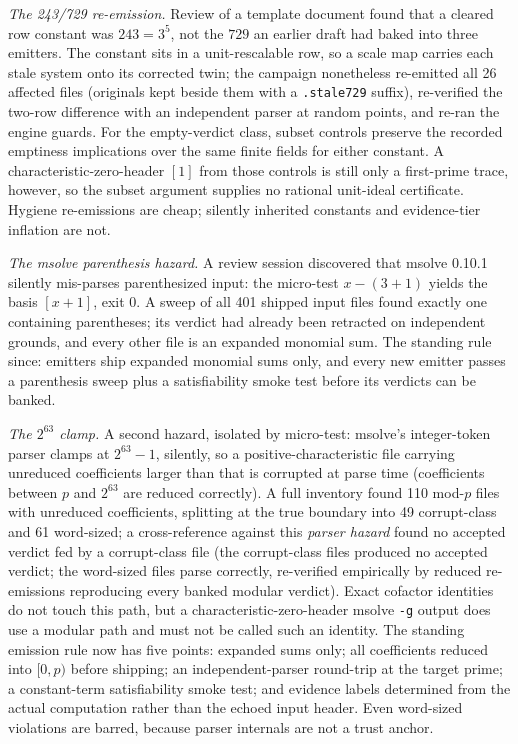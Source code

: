 \documentclass[11pt]{article}
\theoremstyle{definition}
\theoremstyle{remark}
\begin{document}
\emph{The 243/729 re-emission.} Review of a template document found that a cleared row constant was $243=3^5$, not the $729$ an earlier draft had baked into three emitters. The constant sits in a unit-rescalable row, so a scale map carries each stale system onto its corrected twin; the campaign nonetheless re-emitted all 26 affected files (originals kept beside them with a \texttt{.stale729} suffix), re-verified the two-row difference with an independent parser at random points, and re-ran the engine guards. For the empty-verdict class, subset controls preserve the recorded emptiness implications over the same finite fields for either constant. A characteristic-zero-header $[1]$ from those controls is still only a first-prime trace, however, so the subset argument supplies no rational unit-ideal certificate. Hygiene re-emissions are cheap; silently inherited constants and evidence-tier inflation are not.

\emph{The msolve parenthesis hazard.} A review session discovered that msolve 0.10.1 silently mis-parses parenthesized input: the micro-test $x-(3+1)$ yields the basis $[x+1]$, exit 0. A sweep of all 401 shipped input files found exactly one containing parentheses; its verdict had already been retracted on independent grounds, and every other file is an expanded monomial sum. The standing rule since: emitters ship expanded monomial sums only, and every new emitter passes a parenthesis sweep plus a satisfiability smoke test before its verdicts can be banked.

\emph{The $2^{63}$ clamp.} A second hazard, isolated by micro-test: msolve's integer-token parser clamps at $2^{63}-1$, silently, so a positive-characteristic file carrying unreduced coefficients larger than that is corrupted at parse time (coefficients between $p$ and $2^{63}$ are reduced correctly). A full inventory found 110 mod-$p$ files with unreduced coefficients, splitting at the true boundary into 49 corrupt-class and 61 word-sized; a cross-reference against this \emph{parser hazard} found no accepted verdict fed by a corrupt-class file (the corrupt-class files produced no accepted verdict; the word-sized files parse correctly, re-verified empirically by reduced re-emissions reproducing every banked modular verdict). Exact cofactor identities do not touch this path, but a characteristic-zero-header msolve \texttt{-g} output does use a modular path and must not be called such an identity. The standing emission rule now has five points: expanded sums only; all coefficients reduced into $[0,p)$ before shipping; an independent-parser round-trip at the target prime; a constant-term satisfiability smoke test; and evidence labels determined from the actual computation rather than the echoed input header. Even word-sized violations are barred, because parser internals are not a trust anchor.
\end{document}
